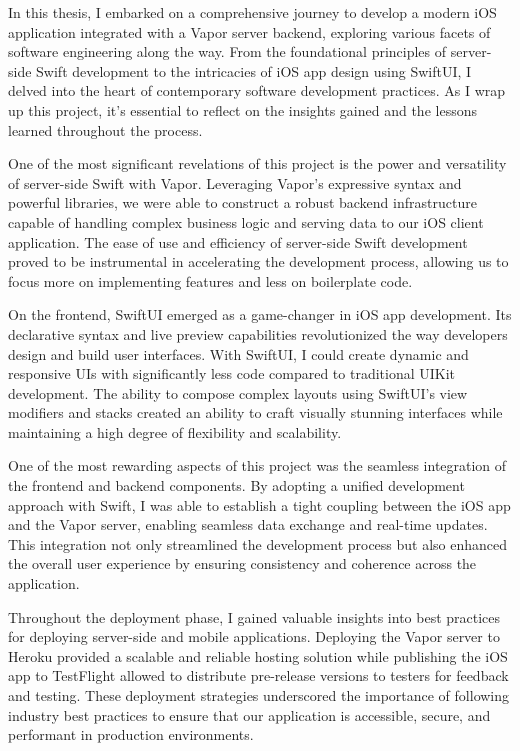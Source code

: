 \documentclass[
  biblatex = false,
  language=english,
  figures=false,
  sourcecodes,
  glossaries,
  index
]{kidiplom}
\begin{document}
\begin{kiconclusions}

In this thesis, I embarked on a comprehensive journey to develop a modern iOS application integrated with a Vapor server backend, exploring various facets of software engineering along the way. From the foundational principles of server-side Swift development to the intricacies of iOS app design using SwiftUI, I delved into the heart of contemporary software development practices. As I wrap up this project, it's essential to reflect on the insights gained and the lessons learned throughout the process.

One of the most significant revelations of this project is the power and versatility of server-side Swift with Vapor. Leveraging Vapor's expressive syntax and powerful libraries, we were able to construct a robust backend infrastructure capable of handling complex business logic and serving data to our iOS client application. The ease of use and efficiency of server-side Swift development proved to be instrumental in accelerating the development process, allowing us to focus more on implementing features and less on boilerplate code.

On the frontend, SwiftUI emerged as a game-changer in iOS app development. Its declarative syntax and live preview capabilities revolutionized the way developers design and build user interfaces. With SwiftUI, I could create dynamic and responsive UIs with significantly less code compared to traditional UIKit development. The ability to compose complex layouts using SwiftUI's view modifiers and stacks created an ability to craft visually stunning interfaces while maintaining a high degree of flexibility and scalability.

One of the most rewarding aspects of this project was the seamless integration of the frontend and backend components. By adopting a unified development approach with Swift, I was able to establish a tight coupling between the iOS app and the Vapor server, enabling seamless data exchange and real-time updates. This integration not only streamlined the development process but also enhanced the overall user experience by ensuring consistency and coherence across the application.

Throughout the deployment phase, I gained valuable insights into best practices for deploying server-side and mobile applications. Deploying the Vapor server to Heroku provided a scalable and reliable hosting solution while publishing the iOS app to TestFlight allowed to distribute pre-release versions to testers for feedback and testing. These deployment strategies underscored the importance of following industry best practices to ensure that our application is accessible, secure, and performant in production environments.


\end{kiconclusions}
\end{document}
